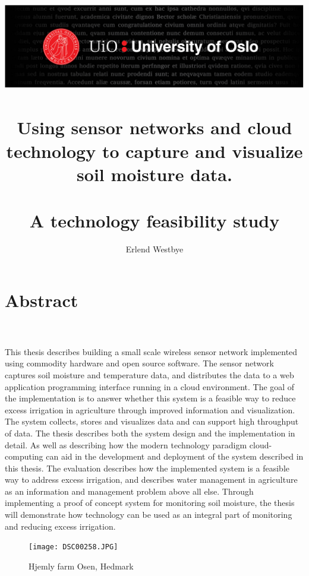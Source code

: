 \documentclass[]{uiophd}
\begin{document}
\title{\includegraphics[scale=0.5]{toppfelt-english.jpg}\\\\
Using sensor networks and cloud technology to capture and visualize soil moisture data.
\\\\
\large A technology feasibility study}
\author{Erlend Westbye}


\frontmatter
\maketitle

\section*{Abstract}
\\\\
This thesis describes building a small scale wireless sensor network implemented using commodity hardware and open source software. The sensor network captures soil moisture and temperature data, and distributes the data to a web application programming interface running in a cloud environment. The goal of the implementation is to answer whether this system is a feasible way to reduce excess irrigation in agriculture through improved information and visualization. The system collects, stores and visualizes data and can support high throughput of data. The thesis describes both the system design and the implementation in detail. As well as describing how the modern technology paradigm cloud-computing can aid in the development and deployment of the system described in this thesis. The evaluation describes how the implemented system is a feasible way to address excess irrigation, and describes water management in agriculture as an information and management problem above all else. Through implementing a proof of concept system for monitoring soil moisture, the thesis will demonstrate how technology can be used as an integral part of monitoring and reducing excess irrigation.

\begin{figure}[h]
\caption{Hjemly farm Osen, Hedmark}
\centering
\texttt{[image: DSC00258.JPG]}
\end{figure}
\tableofcontents
\linespread{1.3}
\end{document}
